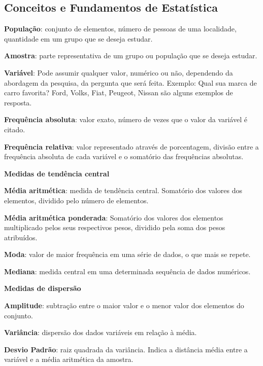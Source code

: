 \begin{multicols*}{2}
	\subsection{Conceitos e Fundamentos de Estatística}

	\textbf{População}: conjunto de elementos, número de pessoas de uma localidade, quantidade em um grupo que se deseja estudar.

	\textbf{Amostra}: parte representativa de um grupo ou população que se deseja estudar.

	\textbf{Variável}: Pode assumir qualquer valor, numérico ou não, dependendo da abordagem da pesquisa, da pergunta que será feita. Exemplo: Qual sua marca de carro favorita? Ford, Volks, Fiat, Peugeot, Nissan são alguns exemplos de resposta.

	\textbf{Frequência absoluta}: valor exato, número de vezes que o valor da variável é citado.

	\textbf{Frequência relativa}: valor representado através de porcentagem, divisão entre a frequência absoluta de cada variável e o somatório das frequências absolutas.

	\textbf{Medidas de tendência central}

	\textbf{Média aritmética}: medida de tendência central. Somatório dos valores dos elementos, dividido pelo número de elementos.

	\textbf{Média aritmética ponderada}: Somatório dos valores dos elementos multiplicado pelos seus respectivos pesos, dividido pela soma dos pesos atribuídos.

	\textbf{Moda}: valor de maior frequência em uma série de dados, o que mais se repete.

	\textbf{Mediana}: medida central em uma determinada sequência de dados numéricos.

	\textbf{Medidas de dispersão}

	\textbf{Amplitude}: subtração entre o maior valor e o menor valor dos elementos do conjunto.

	\textbf{Variância}: dispersão dos dados variáveis em relação à média.

	\textbf{Desvio Padrão}: raiz quadrada da variância. Indica a distância média entre a variável e a média aritmética da amostra.


\end{multicols*}
